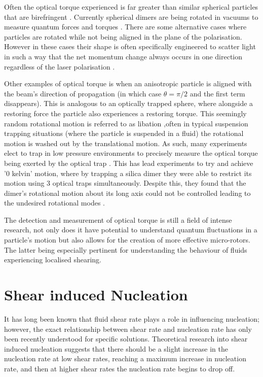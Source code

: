 Often the optical torque experienced is far greater than similar 
spherical particles that are birefringent \cite{Bruce2020}. 
Currently spherical dimers are being rotated in vacuums to 
measure quantum forces and torques \cite{Ahn2018, Reimann2018}. 
There are some alternative cases where particles are rotated 
while not being aligned in the plane of the polarisation. However 
in these cases their shape is often specifically engineered to 
scatter light in such a way that the net momentum change always
occurs in one direction regardless of the laser polarisation 
\cite{Higurashi1994}. 

Other examples of optical torque is when an anisotropic 
particle is aligned with the beam's direction of propagation 
(in which case $\theta=\pi/2$ and the first term disappears). 
This is analogous to an optically trapped sphere, where 
alongside a restoring force the particle also experiences a 
restoring torque. This seemingly random rotational motion is 
referred to as libation \cite{Bruce2020},often in typical 
suspension trapping situations (where the particle is suspended 
in a fluid) the rotational motion is washed out by the 
translational motion. As such, many experiments elect to trap 
in low pressure environments to precisely measure the optical 
torque being exerted by the optical trap \cite{Ahn2018}. This 
has lead experiments to try and achieve '0 kelvin' motion, 
where by trapping a silica dimer they were able to restrict its 
motion using 3 optical traps simultaneously. Despite this, they 
found that the dimer's rotational motion about its long axis 
could not be controlled leading to the undesired rotational
modes \cite{Bang2020}.

The detection and measurement of optical torque is still a 
field of intense research, not only does it have potential 
to understand quantum fluctuations in a particle's motion 
but also allows for the creation of more effective
micro-rotors. The latter being especially pertinent for 
understanding the behaviour of fluids experiencing localised 
shearing.

\section{Shear induced Nucleation}
It has long been known that fluid shear rate plays a role in 
influencing nucleation; however, the exact relationship between 
shear rate and nucleation rate has only been recently understood 
for specific solutions. Theoretical research into shear induced 
nucleation suggests that there should be a slight increase in the 
nucleation rate at low shear rates, reaching a maximum increase in 
nucleation rate, and then at higher shear rates the nucleation rate 
begins to drop off. 

